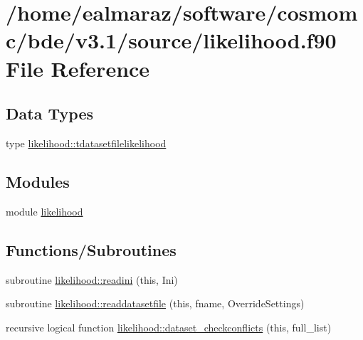 \hypertarget{likelihood_8f90}{}\section{/home/ealmaraz/software/cosmomc/bde/v3.1/source/likelihood.f90 File Reference}
\label{likelihood_8f90}
\subsection*{Data Types}
\begin{DoxyCompactItemize}
\item 
type \mbox{\hyperlink{structlikelihood_1_1tdatasetfilelikelihood}{likelihood\+::tdatasetfilelikelihood}}
\end{DoxyCompactItemize}
\subsection*{Modules}
\begin{DoxyCompactItemize}
\item 
module \mbox{\hyperlink{namespacelikelihood}{likelihood}}
\end{DoxyCompactItemize}
\subsection*{Functions/\+Subroutines}
\begin{DoxyCompactItemize}
\item 
subroutine \mbox{\hyperlink{namespacelikelihood_a0d0df908a010f1e6ba689f48acdf156f}{likelihood\+::readini}} (this, Ini)
\item 
subroutine \mbox{\hyperlink{namespacelikelihood_a9c3cb6205269d789cb3bbe6ad6a87eab}{likelihood\+::readdatasetfile}} (this, fname, Override\+Settings)
\item 
recursive logical function \mbox{\hyperlink{namespacelikelihood_afafdd942174520c5e110fe88a86a248e}{likelihood\+::dataset\+\_\+checkconflicts}} (this, full\+\_\+list)
\end{DoxyCompactItemize}
